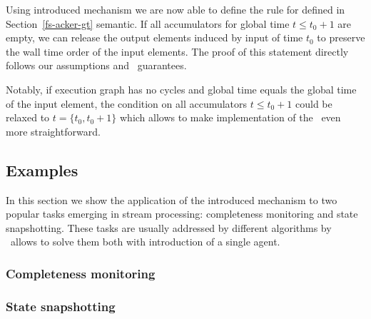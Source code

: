 Using introduced mechanism we are now able to define the rule for defined in Section~\ref{fs-acker-gt} semantic. If all accumulators for global time $t \le t_0 + 1$ are empty, we can release the output elements induced by input of time $t_0$ to preserve the wall time order of the input elements. The proof of this statement directly follows our assumptions and \tracker\ guarantees.

Notably, if execution graph has no cycles and global time equals the global time of the input element, the condition on all accumulators $t \le t_0 + 1$ could be relaxed to $t = \{t_0, t_0 + 1\}$ which allows to make implementation of the \tracker\ even more straightforward.

\subsection{Examples} \label{tracker_examples}
In this section we show the application of the introduced mechanism to two popular tasks emerging in stream processing: completeness monitoring and state snapshotting. These tasks are usually addressed by different algorithms by \tracker\ allows to solve them both with introduction of a single agent.
\subsubsection{Completeness monitoring}

\subsubsection{State snapshotting}



